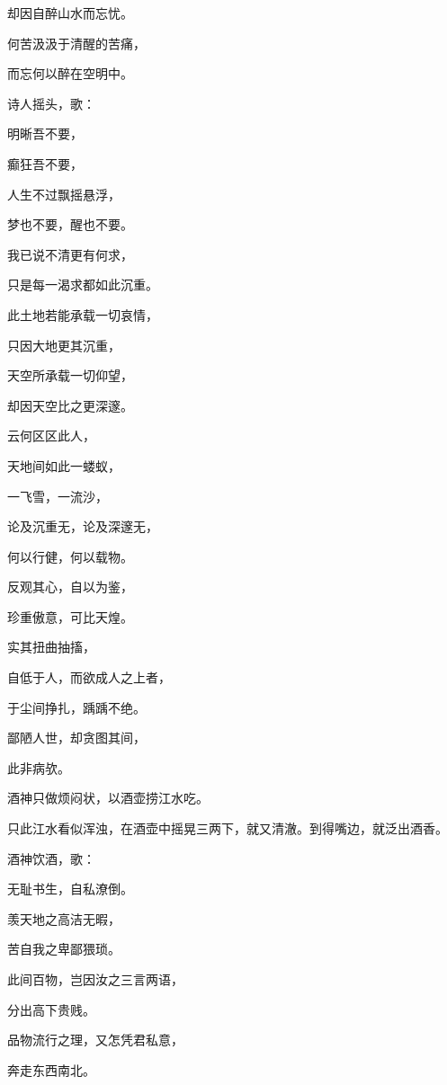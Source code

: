 \documentclass[UTF8]{article}
\begin{document}
\par 却因自醉山水而忘忧。
\par 何苦汲汲于清醒的苦痛，
\par 而忘何以醉在空明中。
\\[0.6cm]
\par 诗人摇头，歌：
\\[0.6cm]
\par 明晰吾不要，
\par 癫狂吾不要，
\par 人生不过飘摇悬浮，
\par 梦也不要，醒也不要。
\par 我已说不清更有何求，
\par 只是每一渴求都如此沉重。
\par 此土地若能承载一切哀情，
\par 只因大地更其沉重，
\par 天空所承载一切仰望，
\par 却因天空比之更深邃。
\par 云何区区此人，
\par 天地间如此一蝼蚁，
\par 一飞雪，一流沙，
\par 论及沉重无，论及深邃无，
\par 何以行健，何以载物。
\par 反观其心，自以为鉴，
\par 珍重傲意，可比天煌。
\par 实其扭曲抽搐，
\par 自低于人，而欲成人之上者，
\par 于尘间挣扎，踽踽不绝。
\par 鄙陋人世，却贪图其间，
\par 此非病欤。
\\[0.6cm]
\par 酒神只做烦闷状，以酒壶捞江水吃。
\par 只此江水看似浑浊，在酒壶中摇晃三两下，就又清澈。到得嘴边，就泛出酒香。
\\[0.6cm]
\par 酒神饮酒，歌：
\\[0.6cm]
\par 无耻书生，自私潦倒。
\par 羡天地之高洁无暇，
\par 苦自我之卑鄙猥琐。
\par 此间百物，岂因汝之三言两语，
\par 分出高下贵贱。
\par 品物流行之理，又怎凭君私意，
\par 奔走东西南北。
\end{document}
